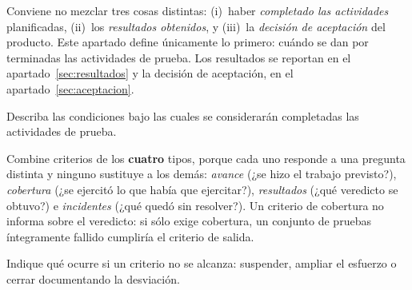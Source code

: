 \begin{notanormativa}
Conviene no mezclar tres cosas distintas: (i)~haber \emph{completado las actividades}
planificadas, (ii)~los \emph{resultados obtenidos}, y (iii)~la \emph{decisión de aceptación} del
producto. Este apartado define únicamente lo primero: cuándo se dan por terminadas las
actividades de prueba. Los resultados se reportan en el apartado~\ref{sec:resultados} y la
decisión de aceptación, en el apartado~\ref{sec:aceptacion}.
\end{notanormativa}

\begin{observacion}
\end{observacion}

\begin{instruccion}
Describa las condiciones bajo las cuales se considerarán completadas las actividades de prueba.

Combine criterios de los \textbf{cuatro} tipos, porque cada uno responde a una pregunta
distinta y ninguno sustituye a los demás: \emph{avance} (¿se hizo el trabajo previsto?),
\emph{cobertura} (¿se ejercitó lo que había que ejercitar?), \emph{resultados} (¿qué veredicto
se obtuvo?) e \emph{incidentes} (¿qué quedó sin resolver?). Un criterio de cobertura no informa
sobre el veredicto: si sólo exige cobertura, un conjunto de pruebas íntegramente fallido
cumpliría el criterio de salida.

Indique qué ocurre si un criterio no se alcanza: suspender, ampliar el esfuerzo o cerrar
documentando la desviación.
\end{instruccion}

